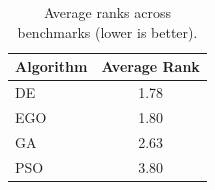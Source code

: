 \begin{table}[h]
\centering
\begin{tabular}{lc}
\hline
Algorithm & Average Rank \\
\hline
DE & 1.78 \\
EGO & 1.80 \\
GA & 2.63 \\
PSO & 3.80 \\
\hline
\end{tabular}
\caption{Average ranks across benchmarks (lower is better).}
\end{table}
